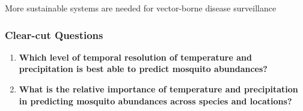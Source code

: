 More sustainable systems are needed for vector-borne disease surveillance \citep{Vazquez-Prokopec2010}

\subsubsection{Clear-cut Questions}
\begin{enumerate}
	

	\item \textbf{Which level of temporal resolution of temperature and precipitation is best able to predict mosquito abundances?}
	
	\item \textbf{What is the relative importance of temperature and precipitation in predicting mosquito abundances across species and locations?}
	
\end{enumerate}

